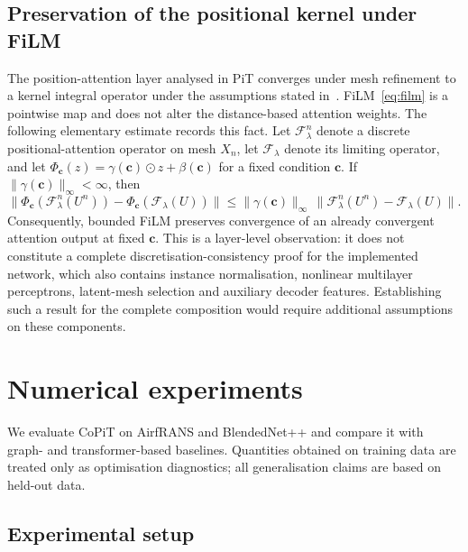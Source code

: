 \documentclass[final,3p,times]{elsarticle}
\begin{document}
\subsection{Preservation of the positional kernel under FiLM}
\label{sec:consistency}
The position-attention layer analysed in PiT converges under mesh refinement to a kernel integral operator under the assumptions stated in~\cite{chen2024pit}. FiLM~\eqref{eq:film} is a pointwise map and does not alter the distance-based attention weights. The following elementary estimate records this fact. Let $\mathcal{F}_{\lambda}^{n}$ denote a discrete positional-attention operator on mesh $X_n$, let $\mathcal{F}_{\lambda}$ denote its limiting operator, and let $\Phi_{\mathbf{c}}(z)=\gamma(\mathbf{c})\odot z+\beta(\mathbf{c})$ for a fixed condition $\mathbf{c}$. If $\|\gamma(\mathbf{c})\|_{\infty}<\infty$, then
\begin{equation}
  \bigl\|\Phi_{\mathbf{c}}(\mathcal{F}_{\lambda}^{n}(U^{n}))
        -\Phi_{\mathbf{c}}(\mathcal{F}_{\lambda}(U))\bigr\|
  \le
  \|\gamma(\mathbf{c})\|_{\infty}\,
  \bigl\|\mathcal{F}_{\lambda}^{n}(U^{n})-\mathcal{F}_{\lambda}(U)\bigr\|.
  \label{eq:composed_convergence}
\end{equation}
Consequently, bounded FiLM preserves convergence of an already convergent attention output at fixed $\mathbf{c}$. This is a layer-level observation: it does not constitute a complete discretisation-consistency proof for the implemented network, which also contains instance normalisation, nonlinear multilayer perceptrons, latent-mesh selection and auxiliary decoder features. Establishing such a result for the complete composition would require additional assumptions on these components.


\section{Numerical experiments}
\label{sec:experiments}
We evaluate CoPiT on AirfRANS and BlendedNet++ and compare it with graph- and transformer-based baselines. Quantities obtained on training data are treated only as optimisation diagnostics; all generalisation claims are based on held-out data.

\subsection{Experimental setup}
\label{sec:setup}
\end{document}
